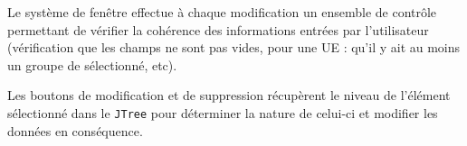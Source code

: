 \documentclass[12pt,a4paper]{article}
\begin{document}



Le système de fenêtre effectue à chaque modification un ensemble de contrôle permettant de vérifier la cohérence des informations entrées par l'utilisateur (vérification que les champs ne sont pas vides, pour une UE : qu'il y ait au moins un groupe de sélectionné, etc).

Les boutons de modification et de suppression récupèrent le niveau de l'élément sélectionné dans le \texttt{JTree} pour déterminer la nature de celui-ci et modifier les données en conséquence.
\end{document}
